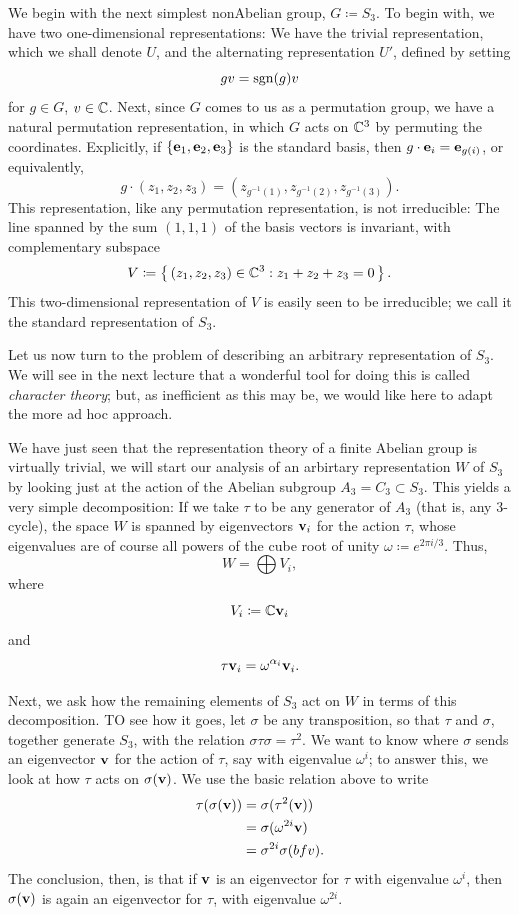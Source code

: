 We begin with the next simplest nonAbelian group, $G\coloneqq S_3$. To
begin with, we have two one-dimensional representations: We have the
trivial representation, which we shall denote $U$, and the alternating
representation $U'$, defined by setting
\[
gv=\operatorname{sgn}(g)v
\]
for $g\in G$, $v\in\mathbb{C}$. Next, since $G$ comes to us as a permutation
group, we have a natural permutation representation, in which $G$ acts on
$\mathbb{C}^3$ by permuting the coordinates. Explicitly, if
$\{\mathbf{e}_1,\mathbf{e}_2,\mathbf{e}_3\}$ is the standard basis, then
$g\cdot\mathbf{e}_i=\mathbf{e}_{g(i)}$, or equivalently,
\[
g\cdot (z_1,z_2,z_3)=\left(z_{g^{-1}(1)},z_{g^{-1}(2)},z_{g^{-1}(3)}\right).
\]
This representation, like any permutation representation, is not
irreducible: The line spanned by the sum $(1,1,1)$ of the basis vectors is
invariant, with complementary subspace
\[
V\coloneqq\left\{\,(z_1,z_2,z_3)\in\mathbb{C}^3:z_1+z_2+z_3=0\,\right\}.
\]
This two-dimensional representation of $V$ is easily seen to be
irreducible; we call it the standard representation of $S_3$.

Let us now turn to the problem of describing an arbitrary representation of
$S_3$. We will see in the next lecture that a wonderful tool for doing this
is called \emph{character theory}; but, as inefficient as this may be, we
would like here to adapt the more ad hoc approach.

We have just seen that the representation theory of a finite Abelian group
is virtually trivial, we will start our analysis of an arbirtary
representation $W$ of $S_3$ by looking just at the action of the Abelian
subgroup $A_3=C_3\subset S_3$. This yields a very simple decomposition: If
we take $\tau$ to be any generator of $A_3$ (that is, any $3$-cycle), the
space $W$ is spanned by eigenvectors $\mathbf{v}_i$ for the action $\tau$, whose
eigenvalues are of course all powers of the cube root of unity
$\omega\coloneqq e^{2\pi i/3}$. Thus,
\[
W=\bigoplus V_i,
\]
where
\[
V_i\coloneqq\mathbb{C}\mathbf{v}_i
\]
and
\[
\tau\mathbf{v}_i=\omega^{\alpha_i}\mathbf{v}_i.
\]

Next, we ask how the remaining elements of $S_3$ act on $W$ in terms of
this decomposition. TO see how it goes, let $\sigma$ be any transposition,
so that $\tau$ and $\sigma$, together generate $S_3$, with the relation
$\sigma\tau\sigma=\tau^2$. We want to know where $\sigma$ sends an
eigenvector $\mathbf{v}$ for the action of $\tau$, say with eigenvalue
$\omega^i$; to answer this, we look at how $\tau$ acts on
$\sigma(\mathbf{v})$. We use the basic relation above to write
\[
  \begin{aligned}
    \tau(\sigma(\mathbf{v}))
    &=\sigma(\tau^2(\mathbf{v}))\\
    &=\sigma(\omega^{2i}\mathbf{v})\\
    &=\sigma^{2i}\sigma(bfv).
  \end{aligned}
\]
The conclusion, then, is that if $\mathbf{v}$ is an eigenvector for $\tau$ with
eigenvalue $\omega^i$, then $\sigma(\mathbf{v})$ is again an eigenvector for
$\tau$, with eigenvalue $\omega^{2i}$.


